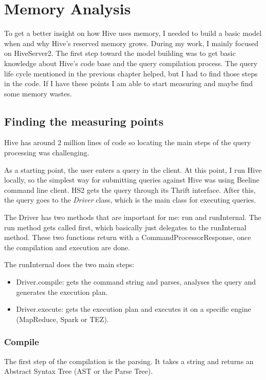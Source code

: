 \chapter{Memory Analysis}
To get a better insight on how Hive uses memory, I needed to build a basic model when and why Hive's reserved memory grows. During my work, I mainly focused on HiveServer2. The first step toward the model building was to get basic knowledge about Hive's code base and the query compilation process. The query life cycle mentioned in the previous chapter helped, but I had to find those steps in the code. If I have these points I am able to start measuring and maybe find some memory wastes.

\section{Finding the measuring points}
Hive has around 2 million lines of code so locating the main steps of the query processing was challenging. 

As a starting point, the user enters a query in the client. At this point, I run Hive locally, so the simplest way for submitting queries against Hive was using Beeline command line client. HS2 gets the query through its Thrift interface. After this, the query goes to the \textit{Driver} class, which is the main class for executing queries.

The Driver has two methods that are important for me: run and runInternal. The run method gets called first, which basically just delegates to the runInternal method. These two functions return with a CommandProcessorResponse, once the compilation and execution are done. 

\noindent The runInternal does the two main steps:
\begin{itemize}
	\item Driver.compile: gets the command string and parses, analyses the query and generates the execution plan.
	\item Driver.execute: gets the execution plan and executes it on a specific engine (MapReduce, Spark or TEZ).
\end{itemize}

\subsection{Compile}
The first step of the compilation is the parsing. It takes a string and returns an Abstract Syntax Tree (AST or the Parse Tree).

